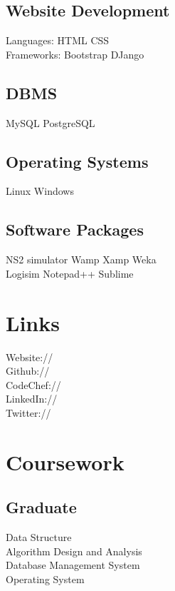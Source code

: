 \documentclass[]{deedy-resume-openfont}
\begin{document}
\begin{minipage}[t]{0.33\textwidth}
\subsection{Website Development}
Languages: HTML \textbullet{} CSS \\
Frameworks: Bootstrap \textbullet{} DJango
\sectionsep
\subsection{DBMS}
MySQL \textbullet{} PostgreSQL
\sectionsep
\subsection{Operating Systems}
Linux \textbullet{} Windows
\sectionsep
\subsection{Software Packages}
NS2 simulator \textbullet{} Wamp \textbullet{} Xamp \textbullet{} Weka \\ Logisim \textbullet{} Notepad++ \textbullet{} Sublime 
\sectionsep



\section{Links}
Website:// \href{https://diksha-rathi.github.io}{} \\
Github:// \href{https://github.com/Diksha-Rathi}{} \\
CodeChef://  \href{https://www.codechef.com/users/codegirl1995}{} \\
LinkedIn://  \href{https://www.linkedin.com/in/diksharathi}{} \\
Twitter://  \href{https://twitter.com/diksha_28795}{} \\
\sectionsep


\section{Coursework}
\subsection{Graduate}
Data Structure \\
Algorithm Design and Analysis \\
Database Management System \\
Operating System \\
\sectionsep

%
%

\end{minipage} 
\end{document}
